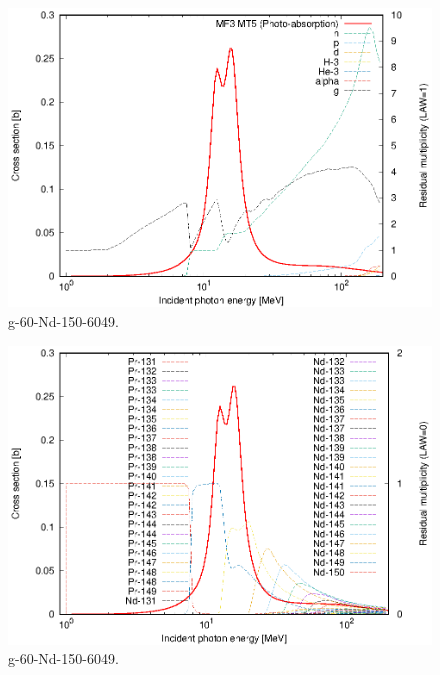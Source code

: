 \begin{figure}
 \includegraphics[width=\linewidth]{eps/g_60-Nd-150_6049.eps}
  \caption{g-60-Nd-150-6049.}
\end{figure}
\begin{figure}
 \includegraphics[width=\linewidth]{eps-law0/g_60-Nd-150_6049.eps}
 \caption{g-60-Nd-150-6049.}
\end{figure}
\newpage \clearpage

